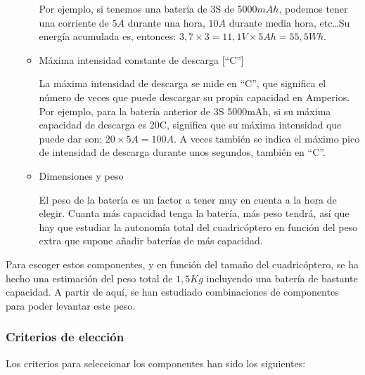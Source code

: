 \documentclass[12pt,twoside]{article}
\begin{document}
\begin{itemize}
\begin{itemize}
			Por ejemplo, si tenemos una batería de 3S de $5000mAh$, podemos tener una corriente de $5A$ durante una hora, $10A$ durante media hora, etc\ldots Su energía acumulada es, entonces: $3,7\times 3=11,1V\times 5Ah=55,5Wh$.
			
			\item Máxima intensidad constante de descarga [``C'']
			
			La máxima intensidad de descarga se mide en ``C'', que significa el número de veces que puede descargar su propia capacidad en Amperios. Por ejemplo, para la batería anterior de 3S 5000mAh, si su máxima capacidad de descarga es 20C, significa que su máxima intensidad que puede dar son: $20\times 5A= 100A$. A veces también se indica el máximo pico de intensidad de descarga durante unos segundos, también en ``C''.

			\item Dimensiones y peso
			
			El peso de la batería es un factor a tener muy en cuenta a la hora de elegir. Cuanta más capacidad tenga la batería, más peso tendrá, así que hay que estudiar la autonomía total del cuadricóptero en función del peso extra que supone añadir baterías de más capacidad.
			
		\end{itemize}
	\end{itemize}
	
	
	Para escoger estos componentes, y en función del tamaño del cuadricóptero, se ha hecho una estimación del peso total de $1,5Kg$ incluyendo una batería de bastante capacidad. A partir de aquí, se han estudiado combinaciones de componentes para poder levantar este peso.
	
	\subsubsection{Criterios de elección}\label{subsubsec:criterios}
	
		Los criterios para seleccionar los componentes han sido los siguientes:
		
\end{document}
